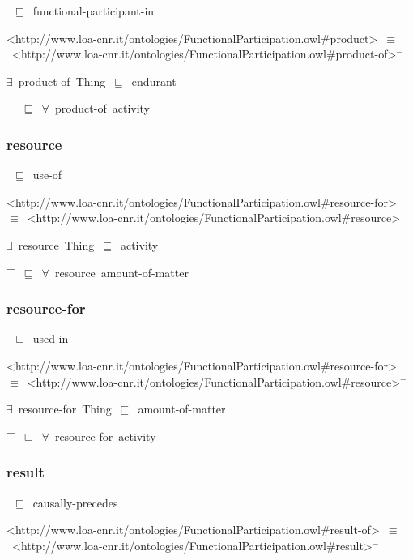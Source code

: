 \documentclass{article}
\begin{document}
~\ensuremath{\sqsubseteq}~functional-participant-in

<http://www.loa-cnr.it/ontologies/FunctionalParticipation.owl#product>~\ensuremath{\equiv}~<http://www.loa-cnr.it/ontologies/FunctionalParticipation.owl#product-of>\ensuremath{^-}

\ensuremath{\exists}~product-of~Thing~\ensuremath{\sqsubseteq}~endurant

\ensuremath{\top}~\ensuremath{\sqsubseteq}~\ensuremath{\forall}~product-of~activity

\subsubsection*{resource}

~\ensuremath{\sqsubseteq}~use-of

<http://www.loa-cnr.it/ontologies/FunctionalParticipation.owl#resource-for>~\ensuremath{\equiv}~<http://www.loa-cnr.it/ontologies/FunctionalParticipation.owl#resource>\ensuremath{^-}

\ensuremath{\exists}~resource~Thing~\ensuremath{\sqsubseteq}~activity

\ensuremath{\top}~\ensuremath{\sqsubseteq}~\ensuremath{\forall}~resource~amount-of-matter

\subsubsection*{resource-for}

~\ensuremath{\sqsubseteq}~used-in

<http://www.loa-cnr.it/ontologies/FunctionalParticipation.owl#resource-for>~\ensuremath{\equiv}~<http://www.loa-cnr.it/ontologies/FunctionalParticipation.owl#resource>\ensuremath{^-}

\ensuremath{\exists}~resource-for~Thing~\ensuremath{\sqsubseteq}~amount-of-matter

\ensuremath{\top}~\ensuremath{\sqsubseteq}~\ensuremath{\forall}~resource-for~activity

\subsubsection*{result}

~\ensuremath{\sqsubseteq}~causally-precedes

<http://www.loa-cnr.it/ontologies/FunctionalParticipation.owl#result-of>~\ensuremath{\equiv}~<http://www.loa-cnr.it/ontologies/FunctionalParticipation.owl#result>\ensuremath{^-}
\end{document}
